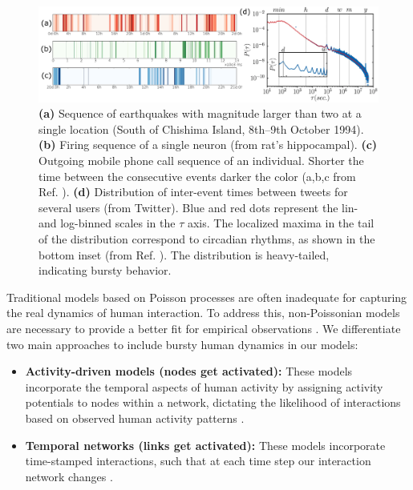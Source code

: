 \begin{figure}
    \centering
    \captionsetup{font=sf}
    \includegraphics[width=\textwidth]{Figs/Introduction/bursty.png}
    \caption[Bursty human dynamics: examples and distribution]{\textbf{(a)} Sequence of earthquakes with magnitude larger than two at a single location (South of Chishima Island, 8th–9th October 1994). \textbf{(b)} Firing sequence of a single neuron (from rat's hippocampal). \textbf{(c)} Outgoing mobile phone call sequence of an individual. Shorter the time between the consecutive events darker the color (a,b,c from Ref. \cite{karsai2012universal}). \textbf{(d)} Distribution of inter-event times between tweets for several users (from Twitter). Blue and red dots represent the lin- and log-binned scales in the $\tau$ axis. The localized maxima in the tail of the distribution correspond to circadian rhythms, as shown in the bottom inset  (from Ref. \cite{artime-2017}). The distribution is heavy-tailed, indicating bursty behavior.}
    \label{fig:bursty_human_dynamics}
\end{figure}

Traditional models based on Poisson processes are often inadequate for capturing the real dynamics of human interaction. To address this, non-Poissonian models are necessary to provide a better fit for empirical observations \cite{Vazquez2006Bursts}. We differentiate two main approaches to include bursty human dynamics in our models:

\begin{itemize}
    \item \textbf{Activity-driven models (nodes get activated):} These models incorporate the temporal aspects of human activity by assigning activity potentials to nodes within a network, dictating the likelihood of interactions based on observed human activity patterns \cite{Perra2012ActivityDriven}.
    \item \textbf{Temporal networks (links get activated):} These models incorporate time-stamped interactions, such that at each time step our interaction network changes \cite{Holme2012Temporal}.
\end{itemize}

